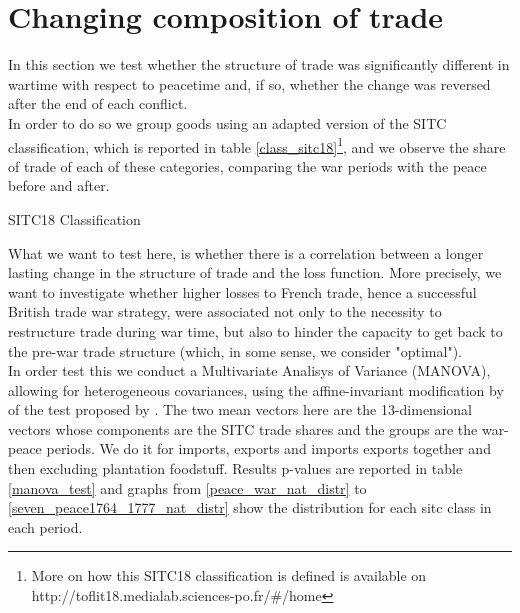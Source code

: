 \documentclass[12pt,a4paper,notitlepage,english]{article}
\begin{document}
\section{Changing composition of trade}  \label{composition}
In this section we test whether the structure of trade was significantly different in wartime with respect to peacetime and, if so, whether the change was reversed after the end of each conflict. \\
In order to do so we group goods using an adapted version of the SITC classification, which is reported in table \ref{class_sitc18}\footnote{More on how this SITC18 classification is defined is available on http://toflit18.medialab.sciences-po.fr/\#/home}, and we observe the share of trade of each of these categories, comparing the war periods with the peace before and after. 
\begin{table}[H]
\centering
\caption{SITC18 Classification}
\label{class_sitc18}

\end{table}
What we want to test here, is whether there is a correlation between a longer lasting change in the structure of trade and the loss function. More precisely, we want to investigate whether higher losses to French trade, hence a successful British trade war strategy, were associated not only to the necessity to restructure trade during war time, but also to hinder the capacity to get back to the pre-war trade structure (which, in some sense, we consider "optimal"). \\
In order test this we conduct a Multivariate Analisys of Variance (MANOVA), allowing for heterogeneous covariances, using the affine-invariant modification by \cite{krishnamoorthy2004modified} of the test proposed by \cite{nel1986solution}. The two mean vectors here are the 13-dimensional vectors whose components are the SITC trade shares and the groups are the war-peace periods. 
We do it for imports, exports and imports exports together and then excluding plantation foodstuff. Results p-values are reported in table \ref{manova_test} and graphs from \ref{peace_war_nat_distr} to \ref{seven_peace1764_1777_nat_distr} show the distribution for each sitc class in each period.\\
\end{document}
